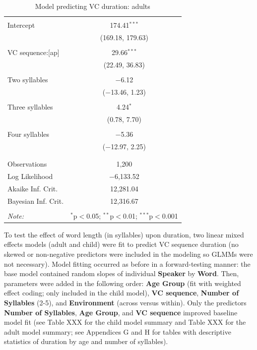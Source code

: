 \documentclass[
]{article}
\begin{document}
\begin{table}[!htbp] \centering 
  \caption{Model predicting VC duration: adults} 
  \label{} 
\begin{tabular}{@{\extracolsep{5pt}}lc} 
\\[-1.8ex]\hline 
\hline \\[-1.8ex] 
 Intercept & 174.41$^{***}$ \\ 
  & (169.18, 179.63) \\ 
  & \\ 
 VC sequence:[ap] & 29.66$^{***}$ \\ 
  & (22.49, 36.83) \\ 
  & \\ 
 Two syllables & $-$6.12 \\ 
  & ($-$13.46, 1.23) \\ 
  & \\ 
 Three syllables & 4.24$^{*}$ \\ 
  & (0.78, 7.70) \\ 
  & \\ 
 Four syllables & $-$5.36 \\ 
  & ($-$12.97, 2.25) \\ 
  & \\ 
\hline \\[-1.8ex] 
Observations & 1,200 \\ 
Log Likelihood & $-$6,133.52 \\ 
Akaike Inf. Crit. & 12,281.04 \\ 
Bayesian Inf. Crit. & 12,316.67 \\ 
\hline 
\hline \\[-1.8ex] 
\textit{Note:}  & \multicolumn{1}{r}{$^{*}$p$<$0.05; $^{**}$p$<$0.01; $^{***}$p$<$0.001} \\ 
\end{tabular} 
\end{table}

To test the effect of word length (in syllables) upon duration, two linear mixed effects models (adult and child) were fit to predict VC sequence duration (no skewed or non-negative predictors were included in the modeling so GLMMs were not necessary). Model fitting occurred as before in a forward-testing manner: the base model contained random slopes of individual \textbf{Speaker} by \textbf{Word}. Then, parameters were added in the following order: \textbf{Age Group} (fit with weighted effect coding; only included in the child model), \textbf{VC sequence}, \textbf{Number of Syllables} (2-5), and \textbf{Environment} (across versus within). Only the predictors \textbf{Number of Syllables}, \textbf{Age Group}, and \textbf{VC sequence} improved baseline model fit (see Table XXX for the child model summary and Table XXX for the adult model summary; see Appendices G and H for tables with descriptive statistics of duration by age and number of syllables).
\end{document}
